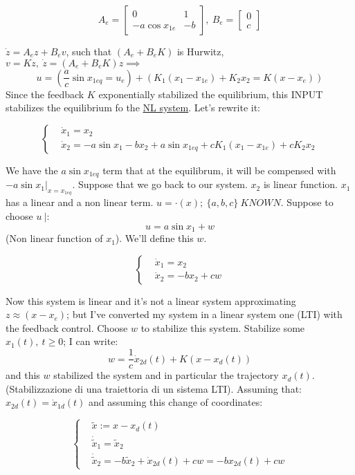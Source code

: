 \[
	A_e = \begin{bmatrix}0&1\\-a\cos{x_{1e}}&-b\end{bmatrix},\ B_e = \begin{bmatrix}0\\c\end{bmatrix}
\]

$\dot{z} = A_ez + B_ev$, such that $(A_e + B_eK)$ is Hurwitz, $v=Kz,\ \dot{z}=(A_e+B_eK)z \implies$
\[
	u = (\frac{a}{c}\sin{x_{1eq}}=u_e) + (K_1(x_1-x_{1e}) + K_2x_2 = K(x-x_e))
\]
Since the feedback $K$ exponentially stabilized the equilibrium, this INPUT stabilizes the equilibrium fo the \underline{NL system}. Let's rewrite it:

\[ 
	\left\{
	\begin{aligned}
	&\dot{x}_1 = x_2 \\
	&\dot{x}_2 = -a\sin{x_1} - bx_2 + a\sin{x_{1eq}} + cK_1(x_1-x_{1e}) + cK_2x_2
	\end{aligned} 
	\right.
\]

We have the $a\sin{x_{1eq}}$ term that at the equilibrum, it will be compensed with $-a\sin{x_1}|_{x=x_{1eq}}$. Suppose that we go back to our system. $x_2$ is linear function. $x_1$ has a linear and a non linear term. $u=\mathord{\cdot}(x);\ \{a,b,c\}\ KNOWN$. Suppose to choose $u\ |$:
\[
	u = a\sin{x_1} + w
\]
(Non linear function of $x_1$). We'll define this $w$.

\[ 
	\left\{
	\begin{aligned}
	&\dot{x}_1 = x_2 \\
	&\dot{x}_2 = -bx_2 + cw
	\end{aligned} 
	\right.
\]

Now this system is linear and it's not a linear system approximating $z \approx (x-x_e)$; but I've converted my system in a linear system one (LTI) with the feedback control. Choose $w$ to stabilize this system. Stabilize some $x_1(t),\ t \geq 0$; I can write:
\[
	w = \frac{1}{c}\dot{x}_{2d}(t)+K(x-x_d(t))
\]
and this $w$ stabilized the system and in particular the trajectory $x_d(t)$. (Stabilizzazione di una traiettoria di un sistema LTI). Assuming that: $x_{2d}(t) = \dot{x}_{1d}(t)$ and assuming this change of coordinates:

\[
	\left\{
	\begin{aligned}
	&\tilde{x} := x-x_d(t) \\
	&\dot{\tilde{x}}_1 = \tilde{x}_2 \\
	&\dot{\tilde{x}}_2 = -b\tilde{x}_2 + \dot{x}_{2d}(t) + cw = -bx_{2d}(t) + cw
	\end{aligned} 
	\right.
\]

